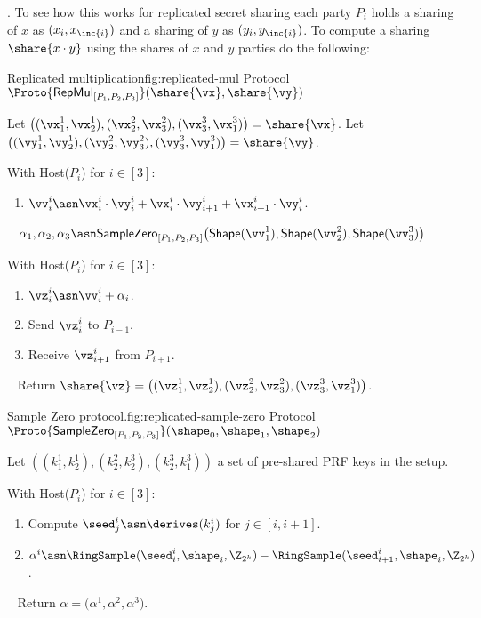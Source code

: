 . 
To see how this works for replicated secret sharing each party $P_i$ holds a
sharing of $x$ as $(x_i, x_{ \inc{i} })$ and a sharing of $y$ as $(y_i, y_{
\inc{i} })$. To compute a sharing $\share{x \cdot y}$ using the shares of $x$
and $y$ parties do the following:



\begin{Boxfig}{Replicated multiplication}{fig:replicated-mul}
  {Protocol $\Proto{\mathsf{RepMul}_{[P_1, P_2, P_3]}}(\share{\vx}, \share{\vy})$}
  
  Let $\big((\vx_1^1, \vx_2^1), (\vx_2^2, \vx_3^2), (\vx_3^3, \vx_1^3) \big) = \share{\vx}$. \newline
  Let $\big((\vy_1^1, \vy_2^1), (\vy_2^2, \vy_3^2), (\vy_3^3, \vy_1^3) \big) = \share{\vy}$. \newline
  
  With Host($P_i$) for $i \in [3]$:
  \begin{enumerate}
    \item $\vv_i^i \asn \vx_i^i \cdot \vy_i^i + \vx_i^i \cdot \vy_{i+1}^i + \vx_{i+1}^i \cdot \vy_i^i$.
  \end{enumerate}
  ~\newline
  $\alpha_1, \alpha_2, \alpha_3 \asn \mathsf{SampleZero}_{[P_1, P_2, P_3]}\big( \mathsf{Shape}(\vv_1^1), \mathsf{Shape}\mathsf(\vv_2^2), \mathsf{Shape}\mathsf(\vv_3^3) \big)$
  ~\newline

  With Host($P_i$) for $i \in [3]$:
  \begin{enumerate}
    \item $\vz_i^i \asn \vv_i^i + \alpha_i$.
    \item Send $\vz_i^i$ to $P_{i-1}$.
    \item Receive $\vz_{i+1}^i$ from $P_{i+1}$.
  \end{enumerate}
  ~\newline
  Return $\share{\vz} = \big((\vz_1^1, \vz_2^1), (\vz_2^2, \vz_3^2), (\vz_3^3, \vz_1^3) \big)$.
\end{Boxfig}


\begin{Boxfig}{Sample Zero protocol.}{fig:replicated-sample-zero}
  {Protocol $\Proto{\mathsf{SampleZero}_{[P_1, P_2, P_3]}}(\shape_0, \shape_1, \shape_2)$}
  
  Let $( (k_1^1, k_2^1), (k_2^2, k_2^3), (k_2^3, k_1^3) )$
  a set of pre-shared PRF keys in the setup.
 \newline
  
  With Host($P_i$) for $i \in [3]$:
  \begin{enumerate}
    \item Compute ${\seed}^i_j \asn \derives(k^i_j)$ for $j \in [i, i+1]$.
    \item $\alpha^i \asn \RingSample(\seed^i_i, \shape_i, \Z_{2^k}) - \RingSample(\seed^i_{i+1}, \shape_i, \Z_{2^k})$.
  \end{enumerate}
  ~\newline
  Return $\alpha = \big(\alpha^1, \alpha^2, \alpha^3 \big)$.
\end{Boxfig}
